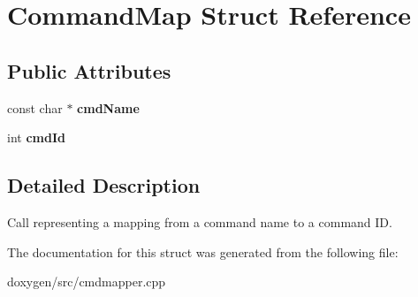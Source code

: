 \hypertarget{struct_command_map}{}\section{Command\+Map Struct Reference}
\label{struct_command_map}
\subsection*{Public Attributes}
\begin{DoxyCompactItemize}
\item 
\mbox{\label{struct_command_map_ac7eaac8a09da90b4f6e7dfae554cf46e}} 
const char $\ast$ {\bfseries cmd\+Name}
\item 
\mbox{\label{struct_command_map_a62c848e39548451d6aa2641791e2b33a}} 
int {\bfseries cmd\+Id}
\end{DoxyCompactItemize}


\subsection{Detailed Description}
Call representing a mapping from a command name to a command ID. 

The documentation for this struct was generated from the following file\+:\begin{DoxyCompactItemize}
\item 
doxygen/src/cmdmapper.\+cpp\end{DoxyCompactItemize}
